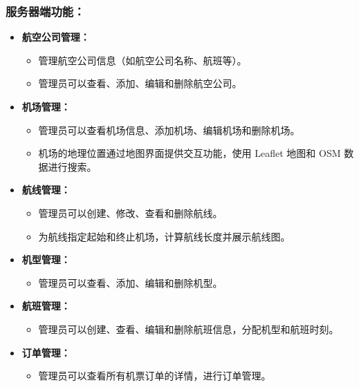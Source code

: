 \documentclass[UTF8, a4paper,12pt]{ctexart}
\begin{document}
\subsubsection{服务器端功能：}
\begin{itemize}
    \item \textbf{航空公司管理：}
    \begin{itemize}
        \item 管理航空公司信息（如航空公司名称、航班等）。
        \item 管理员可以查看、添加、编辑和删除航空公司。
    \end{itemize}

    \item \textbf{机场管理：}
    \begin{itemize}
        \item 管理员可以查看机场信息、添加机场、编辑机场和删除机场。
        \item 机场的地理位置通过地图界面提供交互功能，使用 Leaflet 地图和 OSM 数据进行搜索。
    \end{itemize}

    \item \textbf{航线管理：}
    \begin{itemize}
        \item 管理员可以创建、修改、查看和删除航线。
        \item 为航线指定起始和终止机场，计算航线长度并展示航线图。
    \end{itemize}

    \item \textbf{机型管理：}
    \begin{itemize}
        \item 管理员可以查看、添加、编辑和删除机型。
    \end{itemize}

    \item \textbf{航班管理：}
    \begin{itemize}
        \item 管理员可以创建、查看、编辑和删除航班信息，分配机型和航班时刻。
    \end{itemize}

    \item \textbf{订单管理：}
    \begin{itemize}
        \item 管理员可以查看所有机票订单的详情，进行订单管理。
    \end{itemize}
\end{itemize}
\end{document}
